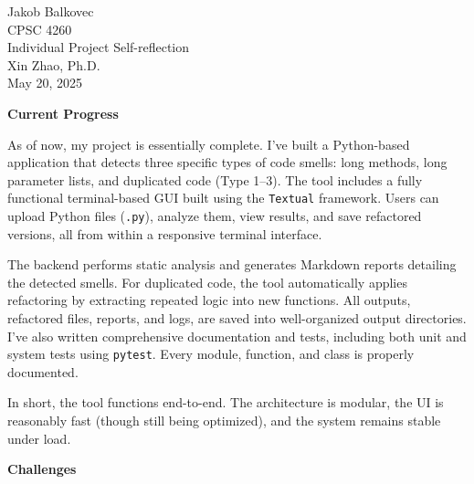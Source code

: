 \documentclass[12pt, letterpaper]{article}
\begin{document}
Jakob Balkovec \\
CPSC 4260 \\
Individual Project Self-reflection \\
Xin Zhao, Ph.D. \\
May 20, 2025

\vspace{1em}

\frenchspacing
\raggedright

\vspace{0.5em}
\noindent\makebox[\linewidth]{\rule{\linewidth}{0.4pt}}
\vspace{-1.7em}
\begin{center}
\textbf{\large Current Progress}
\end{center}
\vspace{-0.3em}
\noindent\makebox[\linewidth]{\rule{\linewidth}{0.4pt}}
\vspace{0.5em}

\quad As of now, my project is essentially complete. I’ve built a Python-based application that detects three specific types of code smells: long methods, long parameter lists, and duplicated code (Type 1–3). The tool includes a fully functional terminal-based GUI built using the \texttt{Textual} framework. Users can upload Python files (\lstinline{.py}), analyze them, view results, and save refactored versions, all from within a responsive terminal interface.

\quad The backend performs static analysis and generates Markdown reports detailing the detected smells. For duplicated code, the tool automatically applies refactoring by extracting repeated logic into new functions. All outputs, refactored files, reports, and logs, are saved into well-organized output directories. I’ve also written comprehensive documentation and tests, including both unit and system tests using \lstinline{pytest}. Every module, function, and class is properly documented.

\quad In short, the tool functions end-to-end. The architecture is modular, the UI is reasonably fast (though still being optimized), and the system remains stable under load.

\newpage
\vspace{0.5em}
\noindent\makebox[\linewidth]{\rule{\linewidth}{0.4pt}}
\vspace{-1.7em}
\begin{center}
\textbf{\large Challenges}
\end{center}
\vspace{-0.3em}
\noindent\makebox[\linewidth]{\rule{\linewidth}{0.4pt}}
\vspace{0.5em}
\end{document}
